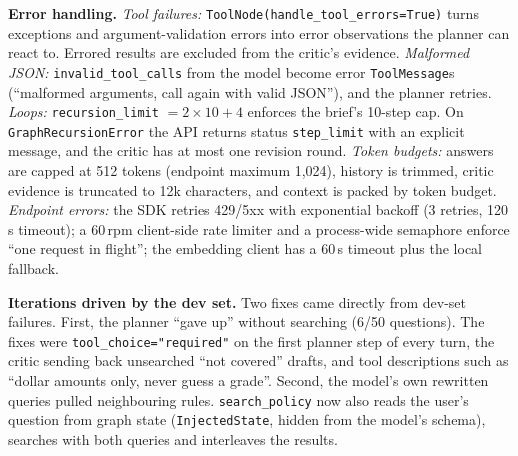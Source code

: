 \textbf{Error handling.}
\emph{Tool failures:} \texttt{ToolNode(handle\_tool\_errors=True)} turns exceptions and argument-validation errors
into error observations the planner can react to. Errored results are excluded from the critic's evidence.
\emph{Malformed JSON:} \texttt{invalid\_tool\_calls} from the model become error \texttt{ToolMessage}s (``malformed
arguments, call again with valid JSON''), and the planner retries.
\emph{Loops:} \texttt{recursion\_limit} $= 2\times10+4$ enforces the brief's 10-step cap. On
\texttt{GraphRecursionError} the API returns status \texttt{step\_limit} with an explicit message, and the critic has
at most one revision round.
\emph{Token budgets:} answers are capped at 512 tokens (endpoint maximum 1,024), history is trimmed, critic
evidence is truncated to 12k characters, and context is packed by token budget.
\emph{Endpoint errors:} the SDK retries 429/5xx with exponential backoff (3 retries, 120\,s timeout); a 60\,rpm
client-side rate limiter and a process-wide semaphore enforce ``one request in flight''; the embedding client has a
60\,s timeout plus the local fallback.

\textbf{Iterations driven by the dev set.} Two fixes came directly from dev-set failures. First, the planner
``gave up'' without searching (6/50 questions). The fixes were \texttt{tool\_choice="required"} on the first planner
step of every turn, the critic sending back unsearched ``not covered'' drafts, and tool descriptions such as
``dollar amounts only, never guess a grade''. Second, the model's own rewritten queries pulled neighbouring rules.
\texttt{search\_policy} now also reads the user's question from graph state (\texttt{InjectedState}, hidden from the
model's schema), searches with both queries and interleaves the results.
